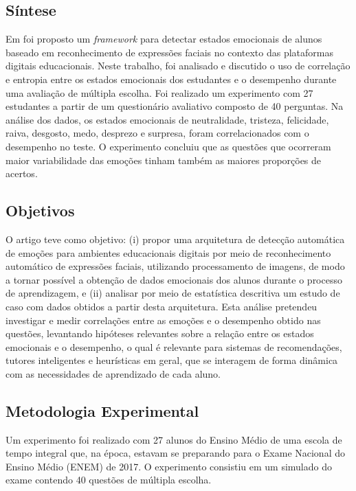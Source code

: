 \subsection{Síntese}
Em \citep{cruz2017framework} foi proposto um \textit{framework} para detectar estados emocionais de alunos baseado em reconhecimento de expressões faciais no contexto das plataformas digitais educacionais. Neste trabalho, foi analisado e discutido o uso de correlação e entropia entre os estados emocionais dos estudantes e o desempenho durante uma avaliação de múltipla escolha. Foi realizado um experimento com 27 estudantes a partir de um questionário avaliativo composto de 40 perguntas. Na análise dos dados, os estados emocionais de neutralidade, tristeza, felicidade, raiva, desgosto, medo, desprezo e surpresa, foram correlacionados com o desempenho no teste. O experimento concluiu que as questões que ocorreram maior variabilidade das emoções tinham também as maiores proporções de acertos.

\subsection{Objetivos}
O artigo \citep{cruz2017framework} teve como objetivo: (i) propor uma arquitetura de detecção automática de emoções para ambientes educacionais digitais por meio de reconhecimento automático de expressões faciais, utilizando processamento de imagens, de modo a tornar possível a obtenção de dados emocionais dos alunos durante o processo de aprendizagem, e (ii) analisar por meio de estatística descritiva um estudo de caso com dados obtidos a partir desta arquitetura. Esta análise pretendeu investigar e medir correlações entre as emoções e o desempenho obtido nas questões, levantando hipóteses relevantes sobre a relação entre os estados emocionais e o desempenho, o qual é relevante para sistemas de recomendações, tutores inteligentes e heurísticas em geral, que se interagem de forma dinâmica com as necessidades de aprendizado de cada aluno.

\subsection{Metodologia Experimental}
Um experimento foi realizado com 27 alunos do Ensino Médio de uma escola de tempo integral que, na época, estavam se preparando para o Exame Nacional do Ensino Médio (ENEM) de 2017. O experimento consistiu em um simulado do exame contendo 40 questões de múltipla escolha.

